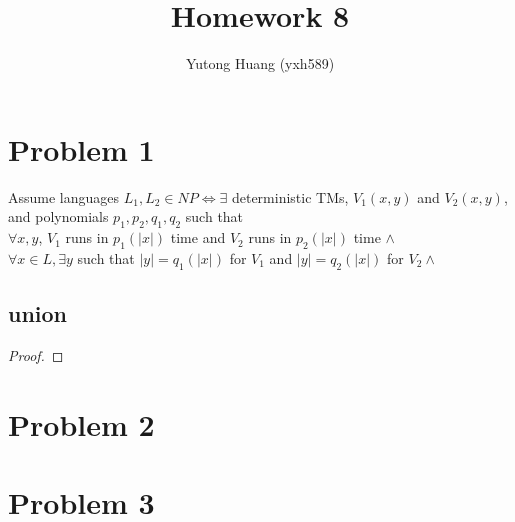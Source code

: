 \documentclass[letterpaper]{article}
\title{\vspace{-2cm}Homework 8}
\author{Yutong Huang (yxh589)}
\date{}
\begin{document}
\maketitle

\section*{Problem 1}
Assume languages $L_1, L_2 \in NP \iff \exists$ deterministic TMs, $V_1(x, y)$ and $V_2(x, y)$, and polynomials $p_1, p_2, q_1, q_2$ such that\\
$\forall x, y$, $V_1$ runs in $p_1(|x|)$ time and $V_2$ runs in $p_2(|x|)$ time $\land$\\
$\forall x \in L, \exists y$ such that $|y|=q_1(|x|)$ for $V_1$ and $|y|=q_2(|x|)$ for $V_2 \land$\\

\subsection*{union}
\begin{proof}

\end{proof}

\section*{Problem 2}


\section*{Problem 3}
\end{document}
